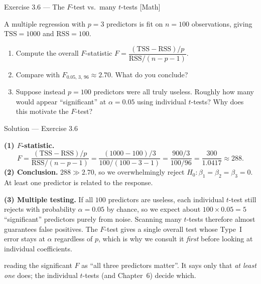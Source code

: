 \documentclass[aspectratio=169,11pt]{beamer}
\begin{document}
\begin{frame}{Exercise 3.6 --- The $F$-test vs.\ many $t$-tests [Math]}
  \begin{exercise}
    A multiple regression with $p=3$ predictors is fit on $n=100$
    observations, giving $\mathrm{TSS}=1000$ and $\mathrm{RSS}=100$.
    \begin{enumerate}
      \item Compute the overall $F$-statistic
            $F=\dfrac{(\mathrm{TSS}-\mathrm{RSS})/p}{\mathrm{RSS}/(n-p-1)}$.
      \item Compare with $F_{0.05,\,3,\,96}\approx 2.70$. What do you
            conclude?
      \item Suppose instead $p=100$ predictors were all truly useless.
            Roughly how many would appear ``significant'' at
            $\alpha=0.05$ using individual $t$-tests? Why does this
            motivate the $F$-test?
    \end{enumerate}
  \end{exercise}
\end{frame}

\begin{frame}{Solution --- Exercise 3.6}
  \begin{solutionbox}
    \textbf{(1) $F$-statistic.}
    \[
      F=\frac{(\mathrm{TSS}-\mathrm{RSS})/p}{\mathrm{RSS}/(n-p-1)}
       =\frac{(1000-100)/3}{100/(100-3-1)}
       =\frac{900/3}{100/96}
       =\frac{300}{1.0417}\approx 288.
    \]
    \textbf{(2) Conclusion.} $288 \gg 2.70$, so we overwhelmingly reject
    $H_0:\beta_1=\beta_2=\beta_3=0$. At least one predictor is related
    to the response.

    \textbf{(3) Multiple testing.} If all $100$ predictors are useless,
    each individual $t$-test still rejects with probability $\alpha=0.05$
    by chance, so we expect about $100\times 0.05 = 5$ ``significant''
    predictors purely from noise. Scanning many $t$-tests therefore
    almost guarantees false positives. The $F$-test gives a single
    overall test whose Type~I error stays at $\alpha$ regardless of $p$,
    which is why we consult it \emph{first} before looking at individual
    coefficients.
  \end{solutionbox}
  \begin{mistake}
    reading the significant $F$ as ``all three
    predictors matter''. It says only that \emph{at least one} does; the
    individual $t$-tests (and Chapter~6) decide which.
  \end{mistake}
\end{frame}
\end{document}
